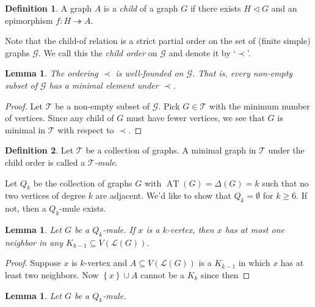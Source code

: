 \documentclass[12pt]{article}
\theoremstyle{plain}
\newtheorem{lem}[thm]{Lemma}
\theoremstyle{definition}
\newtheorem{defn}{Definition}
\theoremstyle{remark}
\newcommand{\fancy}[1]{\mathcal{#1}}
\renewcommand{\L}{\fancy{L}}
\newcommand{\surj}{\twoheadrightarrow}
\newcommand{\set}[1]{\left\{ #1 \right\}}
\newcommand{\AT}{\operatorname{AT}}
\begin{document}
\begin{defn}
A graph $A$ is a \emph{child} of a graph $G$ if there exists $H \lhd G$ and an epimorphism $f\colon H \surj A$.  
\end{defn}

Note that the child-of relation is a strict partial order on the set of (finite simple) graphs $\fancy{G}$.  We call this the \emph{child order} on $\fancy{G}$ and denote it by `$\prec$'.

\begin{lem}\label{well-founded}
The ordering $\prec$ is well-founded on $\fancy{G}$.  That is, every non-empty subset of $\fancy{G}$ has a minimal element under $\prec$.
\end{lem}
\begin{proof}
Let $\fancy{T}$ be a non-empty subset of $\fancy{G}$.  Pick $G \in \fancy{T}$ with the minimum number of vertices.  Since any child of $G$ must have fewer vertices, we see that $G$ is minimal in $\fancy{T}$ with respect to $\prec$.
\end{proof}

\begin{defn}
Let $\fancy{T}$ be a collection of graphs.  A minimal graph in $\fancy{T}$ under the child order is called a \emph{$\fancy{T}$-mule}.
\end{defn}

Let $Q_k$ be the collection of graphs $G$ with $\AT(G) = \Delta(G) = k$ such that no two vertices of degree $k$ are adjacent.
We'd like to show that $Q_k = \emptyset$ for $k \ge 6$.  If not, then a $Q_k$-mule exists.

\begin{lem}
Let $G$ be a $Q_k$-mule.  If $x$ is a $k$-vertex, then $x$ has at most one neighbor in any $K_{k-1} \subseteq V(\L(G))$.
\end{lem}
\begin{proof}
Suppose $x$ is $k$-vertex and $A \subseteq V(\L(G))$ is a $K_{k-1}$ in which $x$ has at least two neighbors.  
Now $\set{x} \cup A$ cannot be a $K_k$ since then 
\end{proof}

\begin{lem}
Let $G$ be a $Q_k$-mule.
\end{lem}
\end{document}
